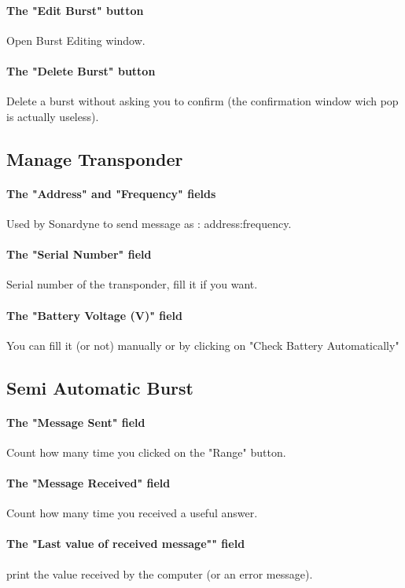 \documentclass[11pt]{report}
\begin{document}
            \paragraph{The "Edit Burst" button}Open Burst Editing window.
            \paragraph{The "Delete Burst" button} Delete a burst without asking you to confirm (the confirmation window wich pop is actually useless).

        \vspace{1cm}
        \subsection{Manage Transponder}
            \paragraph{The "Address" and "Frequency" fields} Used by Sonardyne to send message as : address:frequency.
            \paragraph{The "Serial Number" field} Serial number of the transponder, fill it if you want.
            \paragraph{The "Battery Voltage (V)" field} You can fill it (or not) manually or by clicking on "Check Battery Automatically"

        \vspace{1cm}
        \subsection{Semi Automatic Burst}
            \paragraph{The "Message Sent" field}Count how many time you clicked on the "Range" button.
            \paragraph{The "Message Received" field}Count how many time you received a useful answer.
            \paragraph{The "Last value of received message"" field} print the value received by the computer (or an error message).
\end{document}
